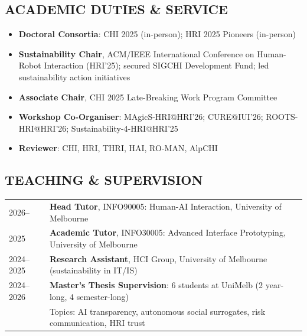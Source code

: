 \documentclass[a4paper, 11pt]{article}
\begin{document}
{\smallskip

\subsection{ACADEMIC DUTIES \& SERVICE}
\vspace{2pt}

\begin{itemize}
  \item \textbf{Doctoral Consortia}: CHI 2025 (in-person); HRI 2025 Pioneers (in-person)
  \item \textbf{Sustainability Chair}, ACM/IEEE International Conference on Human-Robot Interaction (HRI'25); secured SIGCHI Development Fund; led sustainability action initiatives
  \item \textbf{Associate Chair}, CHI 2025 Late-Breaking Work Program Committee
  \item \textbf{Workshop Co-Organiser}: MAgicS-HRI@HRI'26; CURE@IUI'26; ROOTS-HRI@HRI'26; Sustainability-4-HRI@HRI'25
  \item \textbf{Reviewer}: CHI, HRI, THRI, HAI, RO-MAN, AlpCHI
\end{itemize}

\smallskip

\subsection{TEACHING \& SUPERVISION}
\vspace{2pt}

\noindent
\begin{tabularx}{\textwidth}{@{}lX@{}}
2026--     & \textbf{Head Tutor}, INFO90005: Human-AI Interaction, University of Melbourne \\[2pt]
2025       & \textbf{Academic Tutor}, INFO30005: Advanced Interface Prototyping, University of Melbourne \\[2pt]
2024--2025 & \textbf{Research Assistant}, HCI Group, University of Melbourne (sustainability in IT/IS) \\[2pt]
2024--2026 & \textbf{Master's Thesis Supervision}: 6 students at UniMelb (2 year-long, 4 semester-long) \\
           & Topics: AI transparency, autonomous social surrogates, risk communication, HRI trust \\
\end{tabularx}

\smallskip

}
\end{document}
